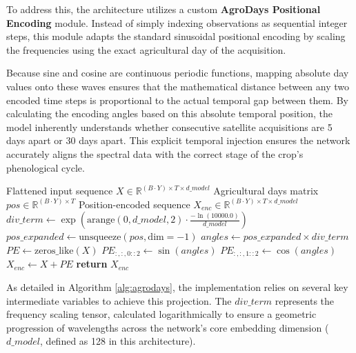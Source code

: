 To address this, the architecture utilizes a custom \textbf{AgroDays Positional Encoding} module.
Instead of simply indexing observations as sequential integer steps, this module adapts the standard sinusoidal positional
encoding \cite{attention_is_all_you_need} by scaling the frequencies using the exact agricultural day of the acquisition.

Because sine and cosine are continuous periodic functions, mapping absolute day values onto these waves ensures that the mathematical distance
between any two encoded time steps is proportional to the actual temporal gap between them.
By calculating the encoding angles based on this absolute temporal position, the model inherently understands whether consecutive satellite acquisitions are 5 days apart or 30 days apart.
This explicit temporal injection ensures the network accurately aligns the spectral data with the correct stage of the crop's phenological cycle.

\begin{algorithm}[htpb]
    \caption{AgroDays Positional Encoding}
    \label{alg:agrodays}
    \begin{algorithmic}[1]
        \Require Flattened input sequence $X \in \mathbb{R}^{(B \cdot Y) \times T \times d\_model}$
        \Require Agricultural days matrix $pos \in \mathbb{R}^{(B \cdot Y) \times T}$
        \Ensure Position-encoded sequence $X_{enc} \in \mathbb{R}^{(B \cdot Y) \times T \times d\_model}$
        \vspace{1.5mm}
        \State $div\_term \gets \exp\left(\text{arange}(0, d\_model, 2) \cdot \frac{-\ln(10000.0)}{d\_model}\right)$
        \State $pos\_expanded \gets \text{unsqueeze}(pos, \text{dim}=-1)$
        \State $angles \gets pos\_expanded \times div\_term$
        \State $PE \gets \text{zeros\_like}(X)$
        \State $PE_{:,:,0::2} \gets \sin(angles)$ 
        \State $PE_{:,:,1::2} \gets \cos(angles)$ 
        \State $X_{enc} \gets X + PE$ 
        \State \textbf{return} $X_{enc}$
    \end{algorithmic}
\end{algorithm}

As detailed in Algorithm \ref{alg:agrodays}, the implementation relies on several key intermediate variables to achieve this projection.
The $div\_term$ represents the frequency scaling tensor, calculated logarithmically to ensure a geometric progression
of wavelengths across the network's core embedding dimension ($d\_model$, defined as 128 in this architecture).

